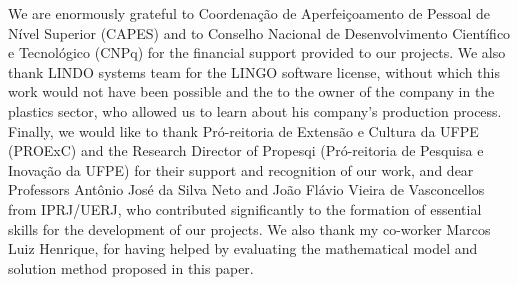 \documentclass[authoryear,manuscript,12pt]{elsarticle}
\begin{document}
We are enormously grateful to Coordenação de Aperfeiçoamento de Pessoal de Nível Superior (CAPES) and to Conselho Nacional de Desenvolvimento Científico e Tecnológico (CNPq) for the financial support provided to our projects. We also thank LINDO systems team for the LINGO software license, without which this work would not have been possible and the to the owner of the company in the plastics sector, who allowed us to learn about his company's production process. Finally, we would like to thank Pró-reitoria de Extensão e Cultura da UFPE (PROExC) and the Research Director of Propesqi (Pró-reitoria de Pesquisa e Inovação da UFPE) for their support and recognition of our work, and dear Professors Antônio José da Silva Neto and João Flávio Vieira de Vasconcellos from IPRJ/UERJ, who contributed significantly to the formation of essential skills for the development of our projects. We also thank my co-worker Marcos Luiz Henrique, for having helped by evaluating the mathematical model and solution method proposed in this paper.




\end{document}
